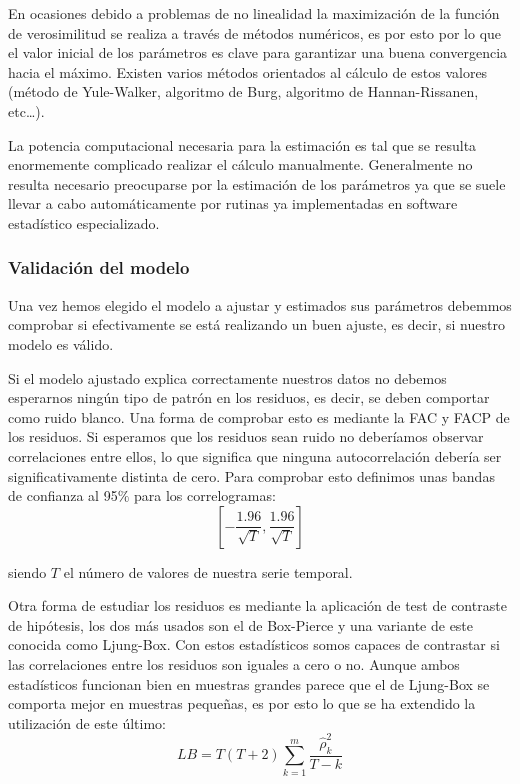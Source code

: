 En ocasiones debido a problemas de no linealidad la maximización de la función de verosimilitud se realiza a través de métodos numéricos, es por esto por lo que el valor inicial de los parámetros es clave para garantizar una buena convergencia hacia el máximo. Existen varios métodos orientados al cálculo de estos valores (método de Yule-Walker, algoritmo de Burg, algoritmo de Hannan-Rissanen, etc…).

La potencia computacional necesaria para la estimación es tal que se resulta enormemente complicado realizar el cálculo manualmente. Generalmente no resulta necesario preocuparse por la estimación de los parámetros ya que se suele llevar a cabo automáticamente por rutinas ya implementadas en software estadístico especializado.

\subsubsection{Validación del modelo}
Una vez hemos elegido el modelo a ajustar y estimados sus parámetros debemmos comprobar si efectivamente se está realizando un buen ajuste, es decir, si nuestro modelo es válido.

Si el modelo ajustado explica correctamente nuestros datos no debemos esperarnos ningún tipo de patrón en los residuos, es decir, se deben comportar como ruido blanco. Una forma de comprobar esto es mediante la FAC y FACP de los residuos. Si esperamos que los residuos sean ruido no deberíamos observar correlaciones entre ellos, lo que significa que ninguna autocorrelación debería ser significativamente distinta de cero. Para comprobar esto definimos unas bandas de confianza al 95$\%$ para los correlogramas:
\begin{equation}
    \left[-\frac{1.96}{\sqrt{T}}, \frac{1.96}{\sqrt{T}}\right]
\end{equation}

\noindent siendo $T$ el número de valores de nuestra serie temporal.

Otra forma de estudiar los residuos es mediante la aplicación de test de contraste de hipótesis, los dos más usados son el de Box-Pierce y una variante de este conocida como Ljung-Box. Con estos estadísticos somos capaces de contrastar si las correlaciones entre los residuos son iguales a cero o no. Aunque ambos estadísticos funcionan bien en muestras grandes parece que el de Ljung-Box se comporta mejor en muestras pequeñas, es por esto lo que se ha extendido la utilización de este último:
\begin{equation}
   LB = T(T + 2) \sum_{k = 1}^{m} \frac{\hat{\rho}^2_{k}}{T-k}
\end{equation}

